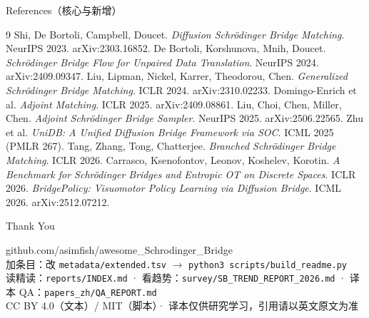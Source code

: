 \documentclass[aspectratio=169,10pt]{beamer}
\begin{document}
\begin{frame}{References（核心与新增）}
\small
\begin{thebibliography}{9}
 Shi, De Bortoli, Campbell, Doucet. \emph{Diffusion Schrödinger Bridge Matching}. NeurIPS 2023. arXiv:2303.16852.
 De Bortoli, Korshunova, Mnih, Doucet. \emph{Schrödinger Bridge Flow for Unpaired Data Translation}. NeurIPS 2024. arXiv:2409.09347.
 Liu, Lipman, Nickel, Karrer, Theodorou, Chen. \emph{Generalized Schrödinger Bridge Matching}. ICLR 2024. arXiv:2310.02233.
 Domingo-Enrich et al. \emph{Adjoint Matching}. ICLR 2025. arXiv:2409.08861.
 Liu, Choi, Chen, Miller, Chen. \emph{Adjoint Schrödinger Bridge Sampler}. NeurIPS 2025. arXiv:2506.22565.
 Zhu et al. \emph{UniDB: A Unified Diffusion Bridge Framework via SOC}. ICML 2025 (PMLR 267).
 Tang, Zhang, Tong, Chatterjee. \emph{Branched Schrödinger Bridge Matching}. ICLR 2026.
 Carrasco, Ksenofontov, Leonov, Koshelev, Korotin. \emph{A Benchmark for Schrödinger Bridges and Entropic OT on Discrete Spaces}. ICLR 2026.
 \emph{BridgePolicy: Visuomotor Policy Learning via Diffusion Bridge}. ICML 2026. arXiv:2512.07212.
\end{thebibliography}
\end{frame}

\begin{frame}{Thank You}
\begin{center}
{\Large github.com/asimfish/awesome\_Schrodinger\_Bridge}\\[10pt]
加条目：改 \texttt{metadata/extended.tsv} $\to$ \texttt{python3 scripts/build\_readme.py}\\
读精读：\texttt{reports/INDEX.md} · 看趋势：\texttt{survey/SB\_TREND\_REPORT\_2026.md} · 译本 QA：\texttt{papers\_zh/QA\_REPORT.md}\\[10pt]
{\small CC BY 4.0（文本）/ MIT（脚本）· 译本仅供研究学习，引用请以英文原文为准}
\end{center}
\end{frame}
\end{document}

